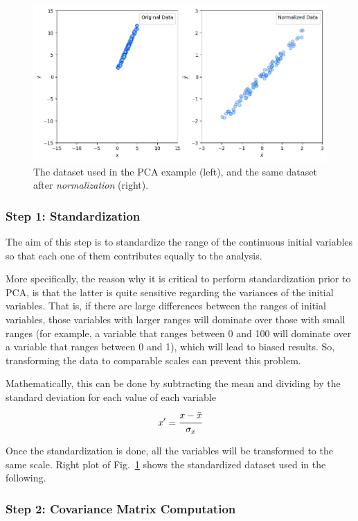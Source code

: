 \begin{enumerate}
\begin{figure}[htb]
	\centering
	\includegraphics[width=0.9\linewidth]{figures/pca_example_raw_normalized_data.png}
	\caption{The dataset used in the PCA example (left), and the same dataset after \emph{normalization} (right).}
	\label{fig:pca_dataset}
\end{figure}

\subsubsection*{Step 1: Standardization}

The aim of this step is to standardize the range of the continuous initial variables so that each one of them contributes equally to the analysis.

More specifically, the reason why it is critical to perform standardization prior to PCA, is that the latter is quite sensitive regarding the variances of the initial variables. That is, if there are large differences between the ranges of initial variables, those variables with larger ranges will dominate over those with small ranges (for example, a variable that ranges between 0 and 100 will dominate over a variable that ranges between 0 and 1), which will lead to biased results. So, transforming the data to comparable scales can prevent this problem.

Mathematically, this can be done by subtracting the mean and dividing by the standard deviation for each value of each variable
\begin{equation*}
x' = \cfrac{x-\bar{x}}{\sigma_x}
\end{equation*}

Once the standardization is done, all the variables will be transformed to the same scale. Right plot of Fig.~\ref{fig:pca_dataset} shows the standardized dataset used in the following.

\subsubsection*{Step 2: Covariance Matrix Computation}


\end{enumerate}
